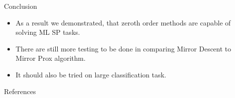 \documentclass{beamer}
\begin{document}

\begin{frame}{Conclusion}

\begin{itemize}

    \item As a result we demonstrated, that zeroth order methods are capable of solving ML SP tasks.
    \item There are still more testing to be done in comparing Mirror Descent to Mirror Prox algorithm.
    
    \item It should also be tried on large classification task.
\end{itemize}
\end{frame}


\begin{frame}{References}
\nocite{*}
{\small


}
\end{frame}
\begin{comment}

\begin{frame}{Solution}

\begin{columns}[c]
\column{0.6\textwidth}
    Column 1
\column{0.4\textwidth}
    Column 2
\end{columns}
\end{frame}

\end{comment}

\begin{comment}
\begin{frame}{Conclusion}
    \begin{block}{Forecast with hierarchical aggregation of}
    \begin{itemize}
        \item types of freight in
        \item stations, regions, and roads,
        \item for a day, week, month, and quarter.
    \end{itemize}
    \end{block}
\end{frame}
\end{comment}
\end{document}
